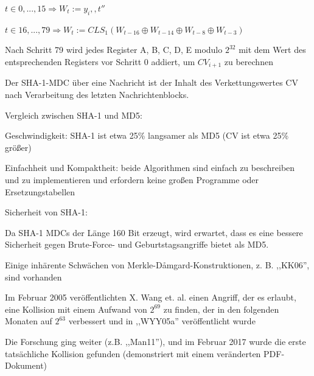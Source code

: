 \documentclass[a4paper]{article}
\begin{document}
\begin{multicols}{3}
\begin{itemize*}
            \begin{itemize*}
                  \item $t\in{0,...,15}\Rightarrow W_t:= y_i,,t''$
                  \item $t\in{16,...,79}\Rightarrow W_t:=CLS_1(W_{t-16}\oplus W_{t-14}\oplus W_{t-8} \oplus W_{t-3})$
                  \item Nach Schritt 79 wird jedes Register A, B, C, D, E modulo $2^{32}$ mit dem Wert des entsprechenden Registers vor Schritt 0 addiert, um $CV_{i+1}$ zu berechnen
            \end{itemize*}
            \item Der SHA-1-MDC über eine Nachricht ist der Inhalt des Verkettungswertes
            CV nach Verarbeitung des letzten Nachrichtenblocks.
            \item Vergleich zwischen SHA-1 und MD5:
            \begin{itemize*}
                  \item Geschwindigkeit: SHA-1 ist etwa 25\% langsamer als MD5 (CV ist etwa 25\% größer)
                  \item Einfachheit und Kompaktheit: beide Algorithmen sind einfach zu beschreiben und zu implementieren und erfordern keine großen Programme oder Ersetzungstabellen
            \end{itemize*}
            \item Sicherheit von SHA-1:
            \begin{itemize*}
                  \item Da SHA-1 MDCs der Länge 160 Bit erzeugt, wird erwartet, dass es eine bessere Sicherheit gegen Brute-Force- und Geburtstagsangriffe bietet als MD5.
                  \item Einige inhärente Schwächen von Merkle-Dåmgard-Konstruktionen, z. B. ,,KK06'', sind vorhanden
                  \item Im Februar 2005 veröffentlichten X. Wang et. al. einen Angriff, der es erlaubt, eine Kollision mit einem Aufwand von $2^{69}$ zu finden, der in den folgenden Monaten auf $2^{63}$ verbessert und in ,,WYY05a'' veröffentlicht wurde
                  \item Die Forschung ging weiter (z.B. ,,Man11''), und im Februar 2017 wurde die erste tatsächliche Kollision gefunden (demonstriert mit einem veränderten PDF-Dokument)
            \end{itemize*}

\end{itemize*}
\end{multicols}
\end{document}
